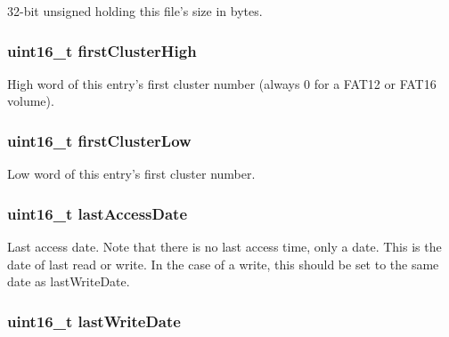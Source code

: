32-\/bit unsigned holding this file's size in bytes. \hypertarget{structdirectory_entry_ad6224dfa27a1c558703f158e93ceafe0}{
\subsubsection[{first\-Cluster\-High}]{\setlength{\rightskip}{0pt plus 5cm}uint16\-\_\-t first\-Cluster\-High}}\label{structdirectory_entry_ad6224dfa27a1c558703f158e93ceafe0}
High word of this entry's first cluster number (always 0 for a F\-A\-T12 or F\-A\-T16 volume). \hypertarget{structdirectory_entry_a3a4f70fb49494208d7eb349969a8acaa}{
\subsubsection[{first\-Cluster\-Low}]{\setlength{\rightskip}{0pt plus 5cm}uint16\-\_\-t first\-Cluster\-Low}}\label{structdirectory_entry_a3a4f70fb49494208d7eb349969a8acaa}
Low word of this entry's first cluster number. \hypertarget{structdirectory_entry_a5635857642ec25e070355257115dafd1}{
\subsubsection[{last\-Access\-Date}]{\setlength{\rightskip}{0pt plus 5cm}uint16\-\_\-t last\-Access\-Date}}\label{structdirectory_entry_a5635857642ec25e070355257115dafd1}
Last access date. Note that there is no last access time, only a date. This is the date of last read or write. In the case of a write, this should be set to the same date as last\-Write\-Date. \hypertarget{structdirectory_entry_a26f462d6e4410d502149973ee6c216fd}{
\subsubsection[{last\-Write\-Date}]{\setlength{\rightskip}{0pt plus 5cm}uint16\-\_\-t last\-Write\-Date}}\label{structdirectory_entry_a26f462d6e4410d502149973ee6c216fd}
